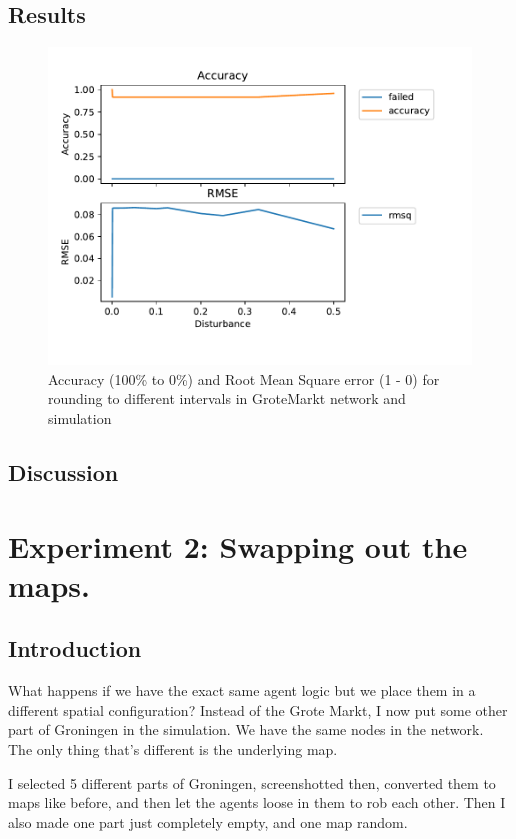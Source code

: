 \subsection{Results}
\begin{figure}[htbp]
\begin{center}
\includegraphics[]{../experiments/GroteMarkt/plots/performance_GroteMarkt.pdf}
\caption{Accuracy (100\% to 0\%) and Root Mean Square error (1 - 0) for rounding to different intervals in GroteMarkt network and simulation}
\label{groteMarkt}
\end{center}
\end{figure}

\subsection{Discussion}

\section{Experiment 2: Swapping out the maps.}
\subsection{Introduction}
What happens if we have the exact same agent logic but we place them in a different spatial configuration? Instead of the Grote Markt, I now put some other part of Groningen in the simulation. We have the same nodes in the network. The only thing that's different is the underlying map.

I selected 5 different parts of Groningen, screenshotted then, converted them to maps like before, and then let the agents loose in them to rob each other.  Then I also made one part just completely empty, and one map random.

